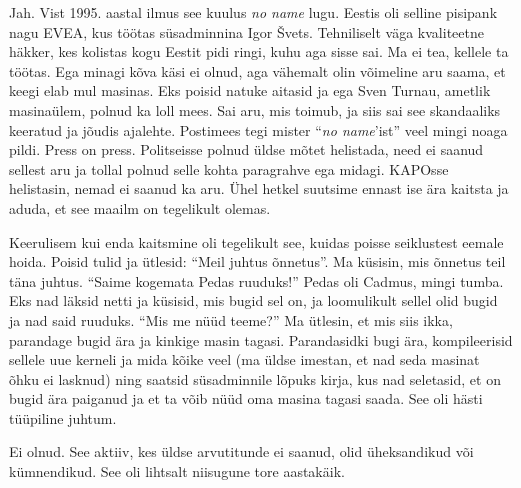 
Jah. Vist 1995. aastal ilmus see kuulus \emph{no name} 
lugu. Eestis oli selline pisipank nagu EVEA, kus töötas süsadminnina Igor 
Švets. Tehniliselt väga 
kvaliteetne häkker, kes kolistas kogu Eestit pidi ringi, kuhu aga sisse sai. Ma 
ei tea, kellele ta töötas. Ega minagi kõva käsi ei 
olnud, aga vähemalt olin võimeline aru saama, et keegi elab mul 
masinas. Eks poisid natuke aitasid ja ega Sven Turnau, 
ametlik masinaülem, polnud ka loll mees. Sai aru, mis toimub, ja siis sai see 
skandaaliks keeratud ja jõudis ajalehte. Postimees tegi mister \enquote{\emph{no name}'ist} veel mingi noaga pildi. Press on press. 
Politseisse polnud üldse mõtet helistada, need ei saanud sellest aru ja tollal 
polnud selle kohta paragrahve ega midagi. KAPOsse helistasin, nemad ei saanud ka aru. Ühel hetkel suutsime ennast ise ära kaitsta ja aduda, et see maailm 
on tegelikult olemas. 

Keerulisem kui enda kaitsmine oli tegelikult see, 
kuidas poisse seiklustest eemale hoida. Poisid tulid ja
ütlesid: \enquote{Meil juhtus õnnetus}. Ma küsisin, mis 
õnnetus teil täna juhtus. \enquote{Saime kogemata Pedas ruuduks!} 
Pedas oli Cadmus, mingi 
tumba. Eks nad läksid netti ja küsisid, mis bugid sel on, ja 
loomulikult sellel olid bugid ja nad said ruuduks. \enquote{Mis me nüüd teeme?} Ma 
ütlesin, et mis siis ikka, parandage bugid ära ja kinkige masin 
tagasi. Parandasidki bugi ära, kompileerisid sellele uue kerneli ja mida kõike veel (ma üldse imestan, et nad seda masinat õhku ei lasknud) ning
saatsid süsadminnile lõpuks kirja, kus nad seletasid, et on bugid ära 
paiganud ja et ta võib nüüd oma masina tagasi saada. See oli hästi 
tüüpiline juhtum.


Ei olnud. See aktiiv, kes üldse arvutitunde ei saanud, olid üheksandikud või 
kümnendikud. See oli lihtsalt niisugune tore aastakäik. 

